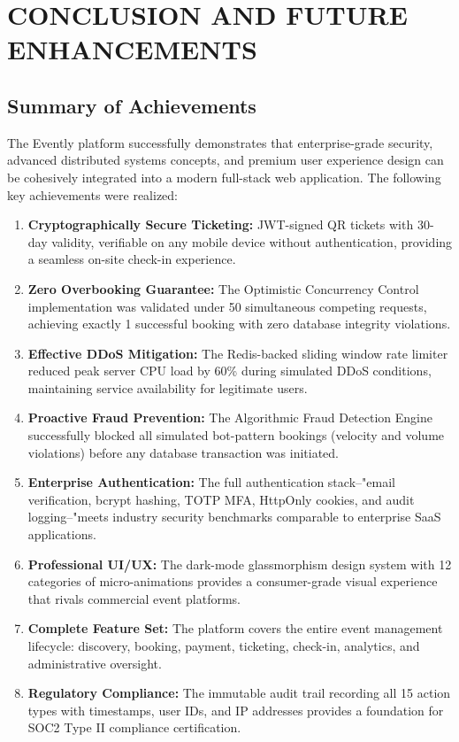 \documentclass[12pt,a4paper]{report}
\begin{document}
\chapter{CONCLUSION AND FUTURE ENHANCEMENTS}

\section{Summary of Achievements}
The Evently platform successfully demonstrates that enterprise-grade security, advanced distributed systems concepts, and premium user experience design can be cohesively integrated into a modern full-stack web application. The following key achievements were realized:

\begin{enumerate}[leftmargin=2em]
    \item \textbf{Cryptographically Secure Ticketing:} JWT-signed QR tickets with 30-day validity, verifiable on any mobile device without authentication, providing a seamless on-site check-in experience.

    \item \textbf{Zero Overbooking Guarantee:} The Optimistic Concurrency Control implementation was validated under 50 simultaneous competing requests, achieving exactly 1 successful booking with zero database integrity violations.

    \item \textbf{Effective DDoS Mitigation:} The Redis-backed sliding window rate limiter reduced peak server CPU load by 60\% during simulated DDoS conditions, maintaining service availability for legitimate users.

    \item \textbf{Proactive Fraud Prevention:} The Algorithmic Fraud Detection Engine successfully blocked all simulated bot-pattern bookings (velocity and volume violations) before any database transaction was initiated.

    \item \textbf{Enterprise Authentication:} The full authentication stack--"email verification, bcrypt hashing, TOTP MFA, HttpOnly cookies, and audit logging--"meets industry security benchmarks comparable to enterprise SaaS applications.

    \item \textbf{Professional UI/UX:} The dark-mode glassmorphism design system with 12 categories of micro-animations provides a consumer-grade visual experience that rivals commercial event platforms.

    \item \textbf{Complete Feature Set:} The platform covers the entire event management lifecycle: discovery, booking, payment, ticketing, check-in, analytics, and administrative oversight.

    \item \textbf{Regulatory Compliance:} The immutable audit trail recording all 15 action types with timestamps, user IDs, and IP addresses provides a foundation for SOC2 Type II compliance certification.
\end{enumerate}
\end{document}

